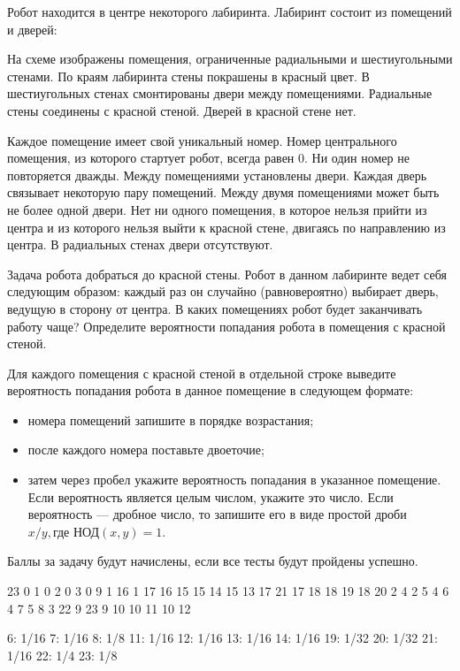 
Робот находится в центре некоторого лабиринта. Лабиринт состоит из помещений и дверей:


На схеме изображены помещения, ограниченные радиальными и шестиугольными стенами. По краям лабиринта стены покрашены в красный цвет. В шестиугольных стенах смонтированы двери между помещениями. Радиальные стены соединены с красной стеной. Дверей в красной стене нет.

Каждое помещение имеет свой уникальный номер. Номер центрального помещения, из которого стартует робот, всегда равен 0. Ни один номер не повторяется дважды. Между помещениями установлены двери. Каждая дверь связывает некоторую пару помещений. Между двумя помещениями может быть не более одной двери. Нет ни одного помещения, в которое нельзя прийти из центра и из которого нельзя выйти к красной стене, двигаясь по направлению из центра. В радиальных стенах двери отсутствуют.

Задача робота добраться до красной стены. Робот в данном лабиринте ведет себя следующим образом: каждый раз он случайно (равновероятно) выбирает дверь, ведущую в сторону от центра. В каких помещениях робот будет заканчивать работу чаще? Определите вероятности попадания робота в помещения с красной стеной.

Для каждого помещения с красной стеной в отдельной строке выведите вероятность попадания робота в данное помещение в следующем формате:

\begin{itemize}
    \item номера помещений запишите в порядке возрастания;
    \item после каждого номера поставьте двоеточие;
    \item затем через пробел укажите вероятность попадания в указанное помещение. Если вероятность является целым числом, 
    укажите это число. Если вероятность — дробное число, то запишите его в виде простой дроби $x/y, \text{где НОД}(x,y)=1$.
\end{itemize}

\markSection

Баллы за задачу будут начислены, если все тесты будут пройдены успешно.


\begin{myverbbox}[\small]{\vinput}
    23
    0 1
    0 2
    0 3
    0 9
    1 16
    1 17
    16 15
    15 14
    15 13
    17 21
    17 18
    18 19
    18 20
    2 4
    2 5
    4 6
    4 7
    5 8
    3 22
    9 23
    9 10
    10 11
    10 12
\end{myverbbox}

\begin{myverbbox}[\small]{\voutput}
    6: 1/16
    7: 1/16
    8: 1/8
    11: 1/16
    12: 1/16
    13: 1/16
    14: 1/16
    19: 1/32
    20: 1/32
    21: 1/16
    22: 1/4
    23: 1/8    
\end{myverbbox}

